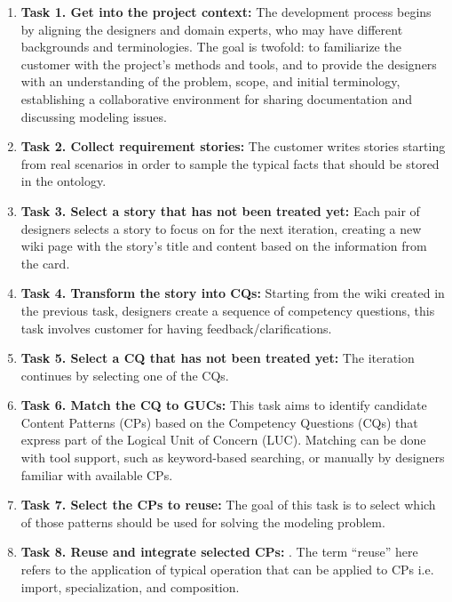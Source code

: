 \begin{enumerate}
    \item \textbf{Task 1. Get into the project context:} The development process begins by aligning the designers and domain experts, who may have different backgrounds and terminologies. The goal is twofold: to familiarize the customer with the project's methods and tools, and to provide the designers with an understanding of the problem, scope, and initial terminology, establishing a collaborative environment for sharing documentation and discussing modeling issues.

    \item \textbf{Task 2. Collect requirement stories:} The customer writes stories starting from real scenarios in order to sample the typical facts that should be stored in the ontology.

    \item \textbf{Task 3. Select a story that has not been treated yet:} Each pair of designers selects a story to focus on for the next iteration, creating a new wiki page with the story's title and content based on the information from the card.

    \item \textbf{Task 4. Transform the story into CQs:} Starting from the wiki created in the previous task, designers create a sequence of competency questions, this task involves customer for having feedback/clarifications.

    \item \textbf{Task 5. Select a CQ that has not been treated yet:} The iteration continues by selecting one of the CQs.

    \item \textbf{Task 6. Match the CQ to GUCs:} This task aims to identify candidate Content Patterns (CPs) based on the Competency Questions (CQs) that express part of the Logical Unit of Concern (LUC). Matching can be done with tool support, such as keyword-based searching, or manually by designers familiar with available CPs.

    \item \textbf{Task 7. Select the CPs to reuse:} The goal of this task is to select which of those patterns should be used for solving the modeling problem. 

    \item \textbf{Task 8. Reuse and integrate selected CPs:} . The term “reuse” here refers to the application of typical operation that can be applied to CPs i.e. import, specialization, and composition. 


\end{enumerate}

